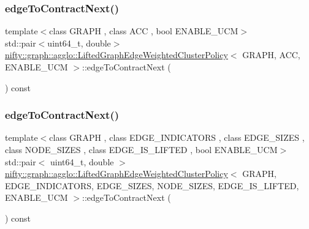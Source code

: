 \subsubsection{\texorpdfstring{edge\+To\+Contract\+Next()}{edgeToContractNext()}\hspace{0.1cm}{\footnotesize\ttfamily [1/2]}}
{\footnotesize\ttfamily template$<$class G\+R\+A\+PH , class A\+CC , bool E\+N\+A\+B\+L\+E\+\_\+\+U\+CM$>$ \\
std\+::pair$<$uint64\+\_\+t, double$>$ \hyperlink{classnifty_1_1graph_1_1agglo_1_1LiftedGraphEdgeWeightedClusterPolicy}{nifty\+::graph\+::agglo\+::\+Lifted\+Graph\+Edge\+Weighted\+Cluster\+Policy}$<$ G\+R\+A\+PH, A\+CC, E\+N\+A\+B\+L\+E\+\_\+\+U\+CM $>$\+::edge\+To\+Contract\+Next (\begin{DoxyParamCaption}{ }\end{DoxyParamCaption}) const}

\mbox{\label{classnifty_1_1graph_1_1agglo_1_1LiftedGraphEdgeWeightedClusterPolicy_ac6a70e6487e7d40638f463be143b2fb0}} 
\subsubsection{\texorpdfstring{edge\+To\+Contract\+Next()}{edgeToContractNext()}\hspace{0.1cm}{\footnotesize\ttfamily [2/2]}}
{\footnotesize\ttfamily template$<$class G\+R\+A\+PH , class E\+D\+G\+E\+\_\+\+I\+N\+D\+I\+C\+A\+T\+O\+RS , class E\+D\+G\+E\+\_\+\+S\+I\+Z\+ES , class N\+O\+D\+E\+\_\+\+S\+I\+Z\+ES , class E\+D\+G\+E\+\_\+\+I\+S\+\_\+\+L\+I\+F\+T\+ED , bool E\+N\+A\+B\+L\+E\+\_\+\+U\+CM$>$ \\
std\+::pair$<$ uint64\+\_\+t, double $>$ \hyperlink{classnifty_1_1graph_1_1agglo_1_1LiftedGraphEdgeWeightedClusterPolicy}{nifty\+::graph\+::agglo\+::\+Lifted\+Graph\+Edge\+Weighted\+Cluster\+Policy}$<$ G\+R\+A\+PH, E\+D\+G\+E\+\_\+\+I\+N\+D\+I\+C\+A\+T\+O\+RS, E\+D\+G\+E\+\_\+\+S\+I\+Z\+ES, N\+O\+D\+E\+\_\+\+S\+I\+Z\+ES, E\+D\+G\+E\+\_\+\+I\+S\+\_\+\+L\+I\+F\+T\+ED, E\+N\+A\+B\+L\+E\+\_\+\+U\+CM $>$\+::edge\+To\+Contract\+Next (\begin{DoxyParamCaption}{ }\end{DoxyParamCaption}) const\hspace{0.3cm}{\ttfamily [inline]}}

